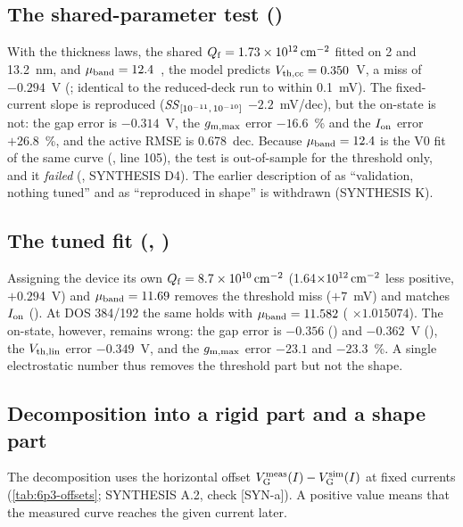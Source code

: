 \subsection{The shared-parameter test ()}
With the thickness laws, the shared $Q_{\mathrm{f}}=\SI{1.73e12}{cm^{-2}}$ fitted on 2 and 13.2~nm, and $\mu_{\mathrm{band}}=12.4$~\cmVs, the model predicts $V_{\mathrm{th,cc}}=0.350$~V, a miss of $-0.294$~V (; identical to the reduced-deck run  to within 0.1~mV). The fixed-current slope is reproduced ($\mathit{SS}_{[10^{-11},\,10^{-10}]}$ $-2.2$~mV/dec), but the on-state is not: the gap error is $-0.314$~V, the $g_{\mathrm{m,max}}$ error $-16.6$~\% and the $I_{\mathrm{on}}$ error $+26.8$~\%, and the active RMSE is 0.678~dec. Because $\mu_{\mathrm{band}}=12.4$ is the V0 fit of the same curve (, line 105), the test is out-of-sample for the threshold only, and it \emph{failed} (\evOOS, SYNTHESIS D4). The earlier description of  as ``validation, nothing tuned'' and as ``reproduced in shape'' is withdrawn (SYNTHESIS K).

\subsection{The tuned fit (, )}
Assigning the device its own $Q_{\mathrm{f}}=\SI{8.7e10}{cm^{-2}}$ (1.64$\times10^{12}\,\mathrm{cm}^{-2}$ less positive, $+0.294$~V) and $\mu_{\mathrm{band}}=11.69$ removes the threshold miss ($+7$~mV) and matches $I_{\mathrm{on}}$ (). At DOS 384/192 the same holds with $\mu_{\mathrm{band}}=11.582$ ( $\times1.015074$). The on-state, however, remains wrong: the gap error is $-0.356$ () and $-0.362$~V (), the $V_{\mathrm{th,lin}}$ error $-0.349$~V, and the $g_{\mathrm{m,max}}$ error $-23.1$ and $-23.3$~\%. A single electrostatic number thus removes the threshold part but not the shape.

\subsection{Decomposition into a rigid part and a shape part}\label{sec:6p3-decomposition}
The decomposition uses the horizontal offset $V_{\mathrm{G}}^{\mathrm{meas}}(I)-V_{\mathrm{G}}^{\mathrm{sim}}(I)$ at fixed currents (\cref{tab:6p3-offsets}; SYNTHESIS A.2, check [SYN-a]). A positive value means that the measured curve reaches the given current later.

